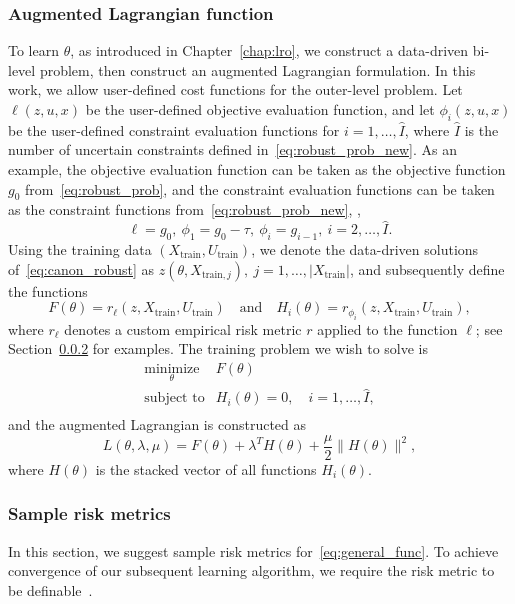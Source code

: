 \subsubsection{Augmented Lagrangian function}
\label{sec:aug_lag_c6}
To learn $\theta$, as introduced in Chapter~\ref{chap:lro}, we construct a data-driven bi-level problem, then construct an augmented Lagrangian formulation.
In this work, we allow user-defined cost functions for the outer-level problem. Let $\ell(z,u,x)$ be the user-defined objective evaluation function, and let $\phi_i(z,u,x)$ be the user-defined constraint evaluation functions for $i = 1,\dots,\hat{I}$, where $\hat{I}$ is the number of uncertain constraints defined in~\eqref{eq:robust_prob_new}. 
As an example, the objective evaluation function can be taken as the objective function $g_0$ from~\eqref{eq:robust_prob}, and the constraint evaluation functions can be taken as the constraint functions from~\eqref{eq:robust_prob_new}, \ie,
$$ \ell = g_0,~\phi_1 = g_0-\tau,~\phi_{i} = g_{i-1},~i = 2,\dots,\hat{I}.$$
Using the training data $(X_{\text{train}},U_{\text{train}})$, we denote the data-driven solutions of~\eqref{eq:canon_robust} as $z(\theta,X_{\text{train},{j}}), ~j=1,\dots,|X_{\text{train}}|$, and subsequently define the functions
\begin{equation}
\label{eq:general_func}
F(\theta) = r_\ell(z,X_{\text{train}},U_{\text{train}}) \quad \text{and}\quad H_i(\theta) = r_{\phi_i}(z,X_{\text{train}},U_{\text{train}}),
\end{equation}
where $r_\ell$ denotes a custom empirical risk metric $r$ applied to the function $\ell$; see Section~\ref{sec:risk} for examples. 
The training problem we wish to solve is
\begin{equation}
	\label{eq:bilevel_sampled_c6}
	\begin{array}{ll}
		\underset{\theta}{\mbox{minimize}} & F(\theta) \\
		\mbox{subject to} & H_i(\theta) = 0,\quad i = 1,\dots,\hat{I},\\
	\end{array}
\end{equation}
and the augmented Lagrangian is constructed as 
\begin{equation}
\label{eq:aug_lag}
    L(\theta,\lambda,\mu) = F(\theta) + \lambda^T H(\theta) + \frac{\mu}{2}\|H(\theta)\|^2,
\end{equation}
where $H(\theta)$ is the stacked vector of all functions $H_i(\theta)$.


\subsubsection{Sample risk metrics}
\label{sec:risk}
In this section, we suggest sample risk metrics for~\eqref{eq:general_func}. To achieve convergence of our subsequent learning algorithm, we require the risk metric to be definable~\cite{definable,definable2}.

